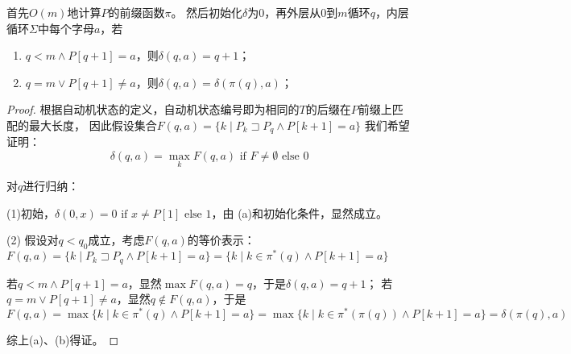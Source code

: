 \begin{solution}
    首先$O(m)$地计算$P$的前缀函数$\pi$。
    然后初始化$\delta$为0，再外层从$0$到$m$循环$q$，内层循环$\Sigma$中每个字母$a$，若
    \begin{enumerate}
        \item $q < m \wedge P[q+1] = a$，则$\delta(q,a) = q+1$；
        \item $q = m \vee P[q+1] \neq a$，则$\delta(q,a) = \delta(\pi(q),a)$；
    \end{enumerate}
    \begin{proof}

            
            根据自动机状态的定义，自动机状态编号即为相同的$T$的后缀在$P$前缀上匹配的最大长度，
            因此假设集合$F(q,a)=\{k\mid P_k \sqsupset P_q \wedge P[k+1] = a\}$ 
            我们希望证明：
            $$\delta(q,a) = \max_k F(q,a) \text{ if } F \neq \emptyset \text{ else } 0$$
            
            对$q$进行归纳：
            
            (1)初始，$\delta(0,x)=0 \text{ if } x \neq P[1] \text{ else } 1$，由
            (a)和初始化条件，显然成立。
            
            (2) 假设对$q<q_0$成立，考虑$F(q,a)$的等价表示：
            $F(q,a)=\{k\mid P_k \sqsupset P_q \wedge P[k+1] = a\} = \{k\mid k \in \pi^*(q) \wedge P[k+1] = a\}$

            若$q < m \wedge P[q+1] = a$，显然$\max F(q,a) = q$，于是$\delta(q,a) = q+1$；
            若$q = m \vee P[q+1] \neq a$，显然$q \notin F(q,a)$，于是$F(q,a) = \max\{k\mid k \in \pi^*(q) \wedge P[k+1] = a\}=\max\{k\mid k \in \pi^*(\pi(q)) \wedge P[k+1] = a\}=\delta(\pi(q),a)$

           综上(a)、(b)得证。
            



            
    \end{proof}
\end{solution}
